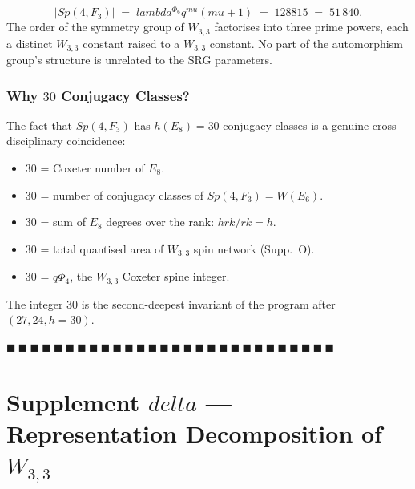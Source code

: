 \documentclass[12pt,a4paper]{article}
\def\mathbb#1{#1}%
\def\mathrm#1{#1}%
\def\delta{delta}%
\def\lambda{lambda}%
\def\mu{mu}%
\def\Phi#1{Phi#1}%
\def\cdot{ }%
\theoremstyle{definition}
\newcommand{\Sp}{\mathrm{Sp}}
\newcommand{\FF}{\mathbb{F}}
\begin{document}
\[
\boxed{\;|\Sp(4,\FF_3)| \;=\; \lambda^{\Phi_6}\cdot q^{\mu}\cdot(\mu+1)
\;=\; 128\cdot 81\cdot 5 \;=\; 51\,840.\;}
\]
The order of the symmetry group of $W_{3,3}$ factorises into three
prime powers, each a distinct $W_{3,3}$ constant raised to a $W_{3,3}$
constant. No part of the automorphism group's structure is unrelated
to the SRG parameters.

\section*{Why $30$ Conjugacy Classes?}

The fact that $\Sp(4,\FF_3)$ has $h(E_8) = 30$ conjugacy classes is
a genuine cross-disciplinary coincidence:
\begin{itemize}[leftmargin=2em,nosep]
\item 30 = Coxeter number of $E_8$.
\item 30 = number of conjugacy classes of $\Sp(4,\FF_3) = W(E_6)$.
\item 30 = sum of $E_8$ degrees over the rank: $h\cdot\mathrm{rk}/\mathrm{rk} = h$.
\item 30 = total quantised area of $W_{3,3}$ spin network (Supp.~O).
\item 30 = $q\Phi_4$, the $W_{3,3}$ Coxeter spine integer.
\end{itemize}
The integer 30 is the second-deepest invariant of the program after
$(27,24,h=30)$.

\hfill $\blacksquare\ \blacksquare\ \blacksquare\ \blacksquare\ \blacksquare\ \blacksquare\ \blacksquare\ \blacksquare\ \blacksquare\ \blacksquare\ \blacksquare\ \blacksquare\ \blacksquare\ \blacksquare\ \blacksquare\ \blacksquare\ \blacksquare\ \blacksquare\ \blacksquare\ \blacksquare\ \blacksquare\ \blacksquare\ \blacksquare\ \blacksquare\ \blacksquare\ \blacksquare\ \blacksquare\ \blacksquare$

\clearpage
\part*{\texorpdfstring{Supplement $\delta$ --- Representation Decomposition of $W_{3,3}$}{Supplement delta --- Representation Decomposition of W(3,3)}}
\end{document}
